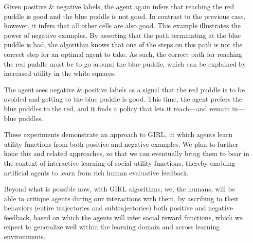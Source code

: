 Given positive \& negative labels, the agent again infers that
reaching the red puddle is good and the blue puddle is not
good. In contrast to the previous case, however, it infers that all
other cells are also good. This example illustrates the power of
negative examples. By asserting that the path terminating at the blue
puddle is bad, the algorithm knows that one of the steps on this path
is not the correct step for an optimal agent to take. As such, the
correct path for reaching the red puddle must be to go around the blue
puddle, which can be explained by increased utility in the white
squares.

The agent sees negative \& positive labels as a signal that the red
puddle is to be avoided and getting to the blue puddle is good.  This
time, the agent prefers the blue puddles to the red, and it finds a
policy that lets it reach---and remain in---blue puddles.


These experiments demonstrate an approach to GIRL, in which agents
learn utility functions from both positive and negative examples.
We plan to further hone this and related approaches, so that we can
eventually bring them to bear in the context of interactive learning
of social utility functions, thereby enabling artificial agents to
learn from rich human evaluative feedback.

Beyond what is possible now, with GIRL algorithms, we, the humans,
will be able to critique agents during our interactions with them, by
ascribing to their behaviors (entire trajectories and subtrajectories)
both positive and negative feedback, based on which the agents will
infer social reward functions, which we expect to generalize well
within the learning domain and across learning environments.
